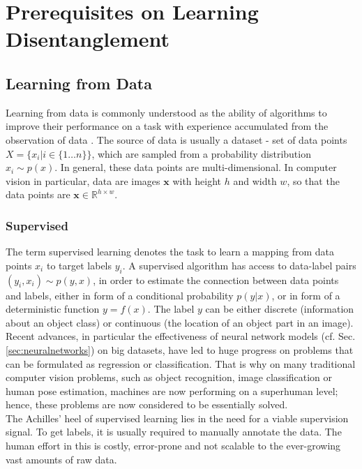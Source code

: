 \chapter{Prerequisites on Learning Disentanglement}\label{sec:prerequisites}



\section{Learning from Data}
	{Learning from data} is commonly understood as the ability of algorithms to improve their performance on a task with experience accumulated from the observation of data \cite{goodfellow16dlb}. The source of data is usually a dataset - set of data points $X = \{x_i | i \in \{1\ldots n\} \}$, which are sampled from a probability distribution $x_i \sim p(x)$.
	In general, these data points are multi-dimensional. In computer vision in particular, data are images $\mathbf{x}$ with height $h$ and width $w$, so that the data points are $\mathbf{x} \in \mathbb{R}^{h \times w}$.

	\subsection{Supervised}\label{sec:supervised}
		The term {supervised learning} denotes the task to learn a mapping from data points $x_i$ to target labels $y_i$.
		A supervised algorithm has access to data-label pairs  $(y_i, x_i) \sim p(y, x)$, in order to estimate the connection between data points and labels, either in form of a conditional probability $p(y|x)$, or in form of a deterministic function $y = f(x)$.
		The label $y$ can be either discrete (\eg information about an object class) or continuous (\eg the location of an object part in an image).
		Recent advances, in particular the effectiveness of neural network models (cf. Sec. \ref{sec:neuralnetworks}) on big datasets, have led to huge progress on problems that can be formulated as regression or classification. That is why on many traditional computer vision problems, such as object recognition, image classification or human pose estimation, machines are now performing on a superhuman level; hence, these problems are now considered to be essentially solved.\\
		The Achilles' heel of supervised learning lies in the need for a viable supervision signal. To get labels, it is usually required to manually annotate the data. The human effort in this is costly, error-prone and not scalable to the ever-growing vast amounts of raw data.

